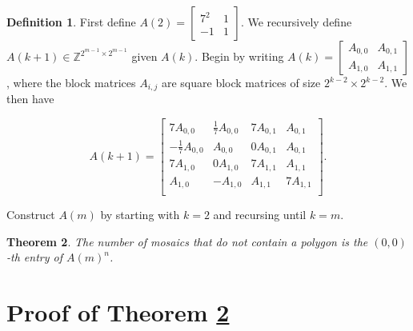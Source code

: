 \documentclass[12pt]{article}
\theoremstyle{plain}
\newtheorem{thm}{Theorem}
\theoremstyle{definition}
\newtheorem{defn}[thm]{Definition}
\theoremstyle{remark}
\theoremstyle{definition}
\begin{document}
\begin{defn}

First define $A(2) = \begin{bmatrix}
7^2 & 1 \\
-1 & 1
\end{bmatrix}$. We recursively define $A(k+1) \in \mathbb{Z}^{2^{m-1} \times 2^{m-1}}$ given $A(k)$. Begin by writing
$
A(k) = \begin{bmatrix}
A_{0,0} & A_{0,1} \\
A_{1,0} & A_{1,1}
\end{bmatrix}
$, where the block matrices $A_{i,j}$ are square block matrices of size $2^{k-2} \times 2^{k-2}$. We then have

$$
A(k+1) = \begin{bmatrix}
    7A_{0,0} & \frac{1}{7}A_{0,0} & 7A_{0,1} & A_{0,1} \\
    -\frac{1}{7}A_{0,0} & A_{0,0} & 0A_{0,1} & A_{0,1} \\
    7A_{1,0} & 0A_{1,0} & 7A_{1,1}  & A_{1,1} \\
    A_{1,0} & -A_{1,0} & A_{1,1} & 7A_{1,1} \\
\end{bmatrix}.
$$

Construct $A(m)$ by starting with $k=2$ and recursing until $k=m$. 

\end{defn}

\begin{thm}
\label{thm: messy mosaics}
The number of mosaics that \textit{do not} contain a polygon is the $(0,0)$-th entry of $A(m)^n$.
\end{thm}

\section{Proof of Theorem \ref{thm: messy mosaics}}
\end{document}
